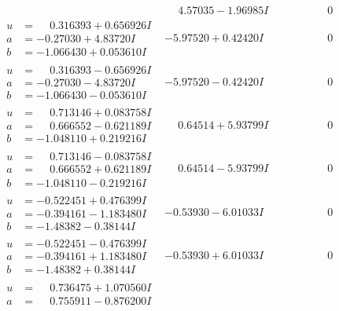\documentclass[1p]{elsarticle_modified}
\theoremstyle{definition}
\begin{document}
$$\begin{array}{c|c|c}
 & \phantom{-}4.57035 - 1.96985 I & \phantom{-0.000000 } 0 \\ \hline\begin{aligned}
u &= \phantom{-}0.316393 + 0.656926 I \\
a &= -0.27030 + 4.83720 I \\
b &= -1.066430 + 0.053610 I\end{aligned}
 & -5.97520 + 0.42420 I & \phantom{-0.000000 } 0 \\ \hline\begin{aligned}
u &= \phantom{-}0.316393 - 0.656926 I \\
a &= -0.27030 - 4.83720 I \\
b &= -1.066430 - 0.053610 I\end{aligned}
 & -5.97520 - 0.42420 I & \phantom{-0.000000 } 0 \\ \hline\begin{aligned}
u &= \phantom{-}0.713146 + 0.083758 I \\
a &= \phantom{-}0.666552 - 0.621189 I \\
b &= -1.048110 + 0.219216 I\end{aligned}
 & \phantom{-}0.64514 + 5.93799 I & \phantom{-0.000000 } 0 \\ \hline\begin{aligned}
u &= \phantom{-}0.713146 - 0.083758 I \\
a &= \phantom{-}0.666552 + 0.621189 I \\
b &= -1.048110 - 0.219216 I\end{aligned}
 & \phantom{-}0.64514 - 5.93799 I & \phantom{-0.000000 } 0 \\ \hline\begin{aligned}
u &= -0.522451 + 0.476399 I \\
a &= -0.394161 - 1.183480 I \\
b &= -1.48382 - 0.38144 I\end{aligned}
 & -0.53930 - 6.01033 I & \phantom{-0.000000 } 0 \\ \hline\begin{aligned}
u &= -0.522451 - 0.476399 I \\
a &= -0.394161 + 1.183480 I \\
b &= -1.48382 + 0.38144 I\end{aligned}
 & -0.53930 + 6.01033 I & \phantom{-0.000000 } 0 \\ \hline\begin{aligned}
u &= \phantom{-}0.736475 + 1.070560 I \\
a &= \phantom{-}0.755911 - 0.876200 I \\

\end{aligned}
\end{array}$$
\end{document}
